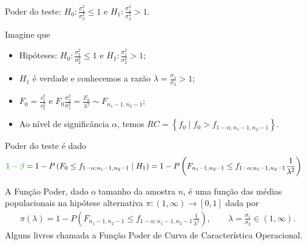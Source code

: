 \documentclass[9pt]{beamer}
\begin{document}
\begin{frame}{Poder do teste: $H_0:\frac{\sigma_1^2}{\sigma_2^2} \leq 1$ e $H_1:\frac{\sigma_1^2}{\sigma_2^2} > 1$.}

\normalsize

Imagine que
\begin{itemize}
	\item Hipóteses: $H_0:\frac{\sigma_1^2}{\sigma_2^2} \leq 1$ e $H_1:\frac{\sigma_1^2}{\sigma_2^2} > 1$;
	\item $H_1$ é verdade e conhecemos a razão $\lambda=\frac{\sigma_1}{\sigma_2} > 1$;
	\item $F_0 = \frac{s_1^2}{s_2^2}$ e $F_0 \frac{\sigma_2^2}{\sigma_1^2} = \frac{F_0}{\lambda^2} \sim F_{n_1-1, n_2-1}$;
	\item Ao nível de significância $\alpha$, temos $RC = \left\{ f_0 \mid f_0 > f_{1-\alpha; n_1-1, n_2-1} \right\}$.
\end{itemize}
\vfill	

Poder do teste é dado
\begin{align*}
\textcolor{important}{1-\beta} &=1 - P\left( F_0 \leq f_{1-\alpha; n_1-1, n_2-1} \mid H_1\right)= 1 - P \left(F_{n_1-1, n_2-1} \leq f_{1-\alpha; n_1-1, n_2-1} \frac{1}{\lambda^2} \right)
\end{align*}
\vfill

A \textcolor{important}{Função Poder}, dado o tamanho da amostra $n$, é uma função das médias populacionais na hipótese alternativa  $\pi: (1,\infty) \longrightarrow [0,1]$ dada por
\begin{align*}
\pi(\lambda) = 1 - P \left(F_{n_1-1, n_2-1} \leq f_{1-\alpha; n_1-1, n_2-1} \frac{1}{\lambda^2} \right), \qquad \lambda = \frac{\sigma_1}{\sigma_2} \in (1, \infty).
\end{align*}
Alguns livros chamada a Função Poder de \textcolor{important}{Curva de Característica Operacional.}

\normalsize
\end{frame}
\end{document}
